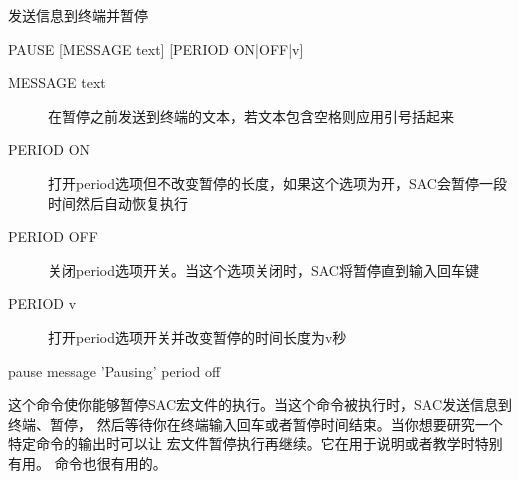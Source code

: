 \label{cmd:pause}

发送信息到终端并暂停

\begin{SACSTX}
PAUSE [MESSAGE text] [PERIOD ON|OFF|v]
\end{SACSTX}

\begin{description}
\item [MESSAGE text] 在暂停之前发送到终端的文本，若文本包含空格则应用引号括起来
\item [PERIOD ON] 打开period选项但不改变暂停的长度，如果这个选项为开，SAC会暂停一段时间然后自动恢复执行
\item [PERIOD OFF] 关闭period选项开关。当这个选项关闭时，SAC将暂停直到输入回车键
\item [PERIOD v] 打开period选项开关并改变暂停的时间长度为v秒
\end{description}

\begin{SACDFT}
pause message 'Pausing' period off
\end{SACDFT}

这个命令使你能够暂停SAC宏文件的执行。当这个命令被执行时，SAC发送信息到终端、暂停，
然后等待你在终端输入回车或者暂停时间结束。当你想要研究一个特定命令的输出时可以让
宏文件暂停执行再继续。它在用于说明或者教学时特别有用。 命令也很有用的。

